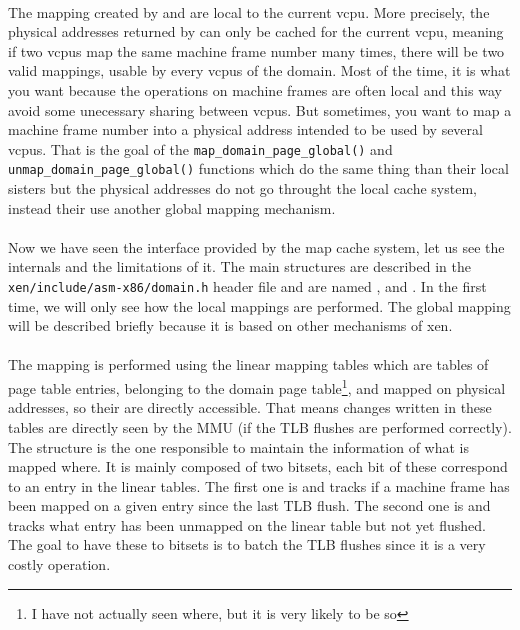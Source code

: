 \paragraph{}
The mapping created by \map and \unmap are local to the current vcpu.
More precisely, the physical addresses returned by \map can only be cached for
the current vcpu, meaning if two vcpus map the same machine frame number many
times, there will be two valid mappings, usable by every vcpus of the domain.
Most of the time, it is what you want because the operations on machine frames
are often local and this way avoid some unecessary sharing between vcpus.
But sometimes, you want to map a machine frame number into a physical address
intended to be used by several vcpus.
That is the goal of the \texttt{map\_domain\_page\_global()} and
\texttt{unmap\_domain\_page\_global()} functions which do the same thing than
their local sisters but the physical addresses do not go throught the local
cache system, instead their use another global mapping mechanism.

\paragraph{}
Now we have seen the interface provided by the map cache system, let us see the
internals and the limitations of it.
The main structures are described in the \texttt{xen/include/asm-x86/domain.h}
header file and are named \dcache, \vcache and \hashent.
In the first time, we will only see how the local mappings are performed.
The global mapping will be described briefly because it is based on other
mechanisms of xen.

\paragraph{}
The mapping is performed using the linear mapping tables which are tables of
page table entries, belonging to the domain page table\footnote{I have not
actually seen where, but it is very likely to be so}, and mapped on physical
addresses, so their are directly accessible.
That means changes written in these tables are directly seen by the MMU (if
the TLB flushes are performed correctly).
The structure \dcache is the one responsible to maintain the information of
what is mapped where.
It is mainly composed of two bitsets, each bit of these correspond to an entry
in the linear tables.
The first one is \inuse and tracks if a machine frame has been mapped on a
given entry since the last TLB flush.
The second one is \garbage and tracks what entry has been unmapped on the
linear table but not yet flushed.
The goal to have these to bitsets is to batch the TLB flushes since it is a
very costly operation.

